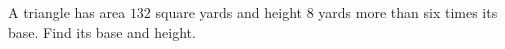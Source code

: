 A triangle has area $132$ square yards and height $8$ yards more than six times its base. Find its base and height.
